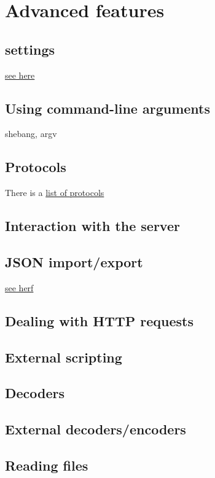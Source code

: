 \chapter{Advanced features}
\section{\Liquidsoap settings}
\href{https://www.liquidsoap.info/doc-dev/settings.html}{see here}

\section{Using command-line arguments}
shebang, argv

\section{Protocols}
There is a \href{https://www.liquidsoap.info/doc-dev/protocols.html}{list of protocols}

\section{Interaction with the server}

\section{JSON import/export}
\href{https://www.liquidsoap.info/doc-dev/json.html}{see herf}

\section{Dealing with HTTP requests}

\section{External scripting}

\section{Decoders}

\section{External decoders/encoders}

\section{Reading files}
